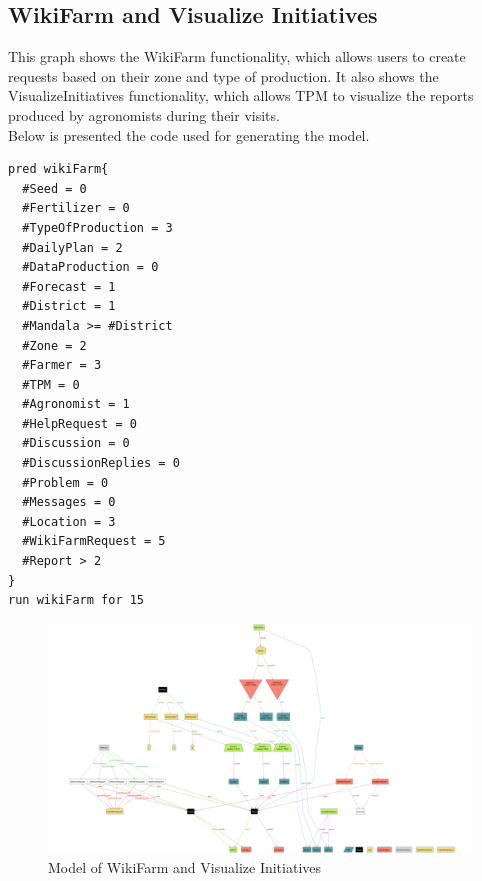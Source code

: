 \subsection{WikiFarm and Visualize Initiatives}
This graph shows the WikiFarm functionality, which allows users to create requests based on their zone and type of production. It also shows the VisualizeInitiatives functionality, which allows TPM to visualize the reports produced by agronomists during their visits.\\
Below is presented the code used for generating the model.
\begin{lstlisting}
pred wikiFarm{
  #Seed = 0
  #Fertilizer = 0
  #TypeOfProduction = 3
  #DailyPlan = 2
  #DataProduction = 0
  #Forecast = 1
  #District = 1
  #Mandala >= #District
  #Zone = 2
  #Farmer = 3
  #TPM = 0
  #Agronomist = 1
  #HelpRequest = 0
  #Discussion = 0
  #DiscussionReplies = 0
  #Problem = 0
  #Messages = 0
  #Location = 3
  #WikiFarmRequest = 5
  #Report > 2
}
run wikiFarm for 15
\end{lstlisting}
\begin{figure}[H]
\centering
	\includegraphics[angle=90,height=1.5\textwidth]{Images/Model/model4.png}
	\caption{Model of WikiFarm and Visualize Initiatives}
\end{figure}
